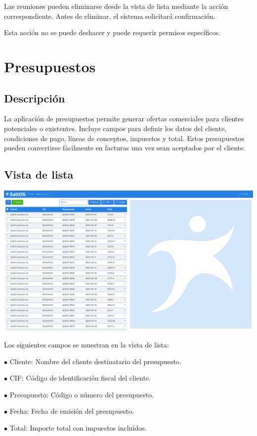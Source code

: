 \documentclass[a4paper]{article}
\begin{document}
Las reuniones pueden eliminarse desde la vista de lista mediante la acción correspondiente.
Antes de eliminar, el sistema solicitará confirmación.

Esta acción no se puede deshacer y puede requerir permisos específicos.


\hypertarget{toc71}{}
\section{Presupuestos}

\hypertarget{toc72}{}
\subsection{Descripción}

La aplicación de presupuestos permite generar ofertas comerciales para clientes potenciales o existentes.
Incluye campos para definir los datos del cliente, condiciones de pago, líneas de conceptos, impuestos y total.
Estos presupuestos pueden convertirse fácilmente en facturas una vez sean aceptados por el cliente.

\hypertarget{toc73}{}
\subsection{Vista de lista}

\begin{center}\includegraphics[width=1\textwidth]{../ujest/snaps/test-screenshots-js-screenshots-crm-quotes-list-es-es-1-snap.png}\end{center}

Los siguientes campos se muestran en la vista de lista:

\begin{compactitem}
\item[\color{myblue}$\bullet$] Cliente: Nombre del cliente destinatario del presupuesto.
\item[\color{myblue}$\bullet$] CIF: Código de identificación fiscal del cliente.
\item[\color{myblue}$\bullet$] Presupuesto: Código o número del presupuesto.
\item[\color{myblue}$\bullet$] Fecha: Fecha de emisión del presupuesto.
\item[\color{myblue}$\bullet$] Total: Importe total con impuestos incluidos.
\end{compactitem}
\end{document}
